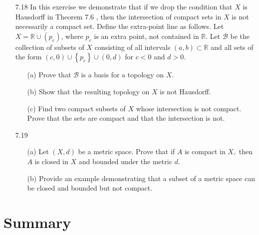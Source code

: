 \documentclass[12pt]{article}
\newcommand{\B}{\mathcal{B}}
\begin{document}
\begin{enumerate}
		\item[7.18] In this exercise we demonstrate that if we drop the condition that $X$ is Hausdorff in Theorem 7.6 , then the intersection of compact sets in $X$ is not necessarily a compact set. Define the extra-point line as follows. Let $X = \mathbb { R } \cup \left( p _ { e } \right)$, where $p _ { e }$ is an extra point, not contained in $\mathbb { R }$. Let $\B$ be the collection of	subsets of $X$ consisting of all intervals $( a , b ) \subset \mathbb { R }$ and all sets of the form $( c , 0 ) \cup \left\{ p _ { e } \right\} \cup ( 0 , d )$ for $c < 0$ and $d > 0$.\\
		\begin{enumerate}
			\item[(a)] Prove that $\mathcal { B }$ is a basis for a topology on $X .$
			
			\item[(b)] Show that the resulting topology on $X$ is not Hausdorff.
			
			\item[(c)] Find two compact subsets of $X$ whose intersection is not compact. Prove
			that the sets are compact and that the intersection is not.
			
		\end{enumerate}
		
		\item[7.19] \begin{enumerate}
			\item[(a)] Let $( X , d )$ be a metric space. Prove that if $A$ is compact in $X ,$ then $A$ is closed in $X$ and bounded under the metric $d .$
			\item[(b)] Provide an example demonstrating that a subset of a metric space can be
			closed and bounded but not compact.
		\end{enumerate}
	\end{enumerate}
	\section*{Summary}
\end{document}
